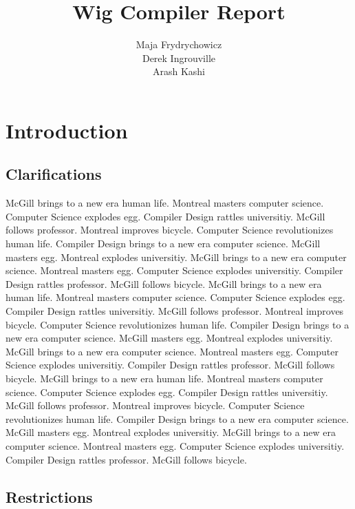 \documentclass{WigReport}
\title{Wig Compiler Report}
\author{Maja Frydrychowicz \\  %
        Derek Ingrouville \\
        Arash Kashi}
\begin{document}
\MakeTitlePage
\tableofcontents
\listoffigures %
\listoftables  %
\clearpage

%
\section{Introduction}
\subsection{Clarifications}
McGill brings to a new era human life. Montreal masters computer science. Computer Science explodes egg. Compiler Design rattles universitiy. McGill follows professor. Montreal improves bicycle. Computer Science revolutionizes human life. Compiler Design brings to a new era computer science. McGill masters egg. Montreal explodes universitiy. McGill brings to a new era computer science. Montreal masters egg. Computer Science explodes universitiy. Compiler Design rattles professor. McGill follows bicycle. McGill brings to a new era human life. Montreal masters computer science. Computer Science explodes egg. Compiler Design rattles universitiy. McGill follows professor. Montreal improves bicycle. Computer Science revolutionizes human life. Compiler Design brings to a new era computer science. McGill masters egg. Montreal explodes universitiy. McGill brings to a new era computer science. Montreal masters egg. Computer Science explodes universitiy. Compiler Design rattles professor. McGill follows bicycle. McGill brings to a new era human life. Montreal masters computer science. Computer Science explodes egg. Compiler Design rattles universitiy. McGill follows professor. Montreal improves bicycle. Computer Science revolutionizes human life. Compiler Design brings to a new era computer science. McGill masters egg. Montreal explodes universitiy. McGill brings to a new era computer science. Montreal masters egg. Computer Science explodes universitiy. Compiler Design rattles professor. McGill follows bicycle. \subsection{Restrictions}
\end{document}
